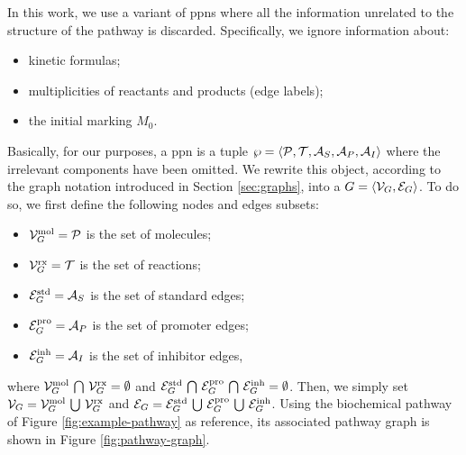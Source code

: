 In this work, we use a variant of \glspl{ppn} where all the information unrelated to the structure of the pathway is discarded. Specifically, we ignore information about:
\begin{itemize}
    \item kinetic formulas;
    \item multiplicities of reactants and products (\ie edge labels);
    \item the initial marking $M_0$.
\end{itemize}
Basically, for our purposes, a \gls{ppn} is a tuple $\wp = \Tuple{\Cal{P},\Cal{T},\Cal{A}_{S}, \Cal{A}_{P},\Cal{A}_{I}}$ where the irrelevant components have been omitted. We rewrite this object, according to the graph notation introduced in Section \ref{sec:graphs}, into a  $G = \Tuple{\Cal{V}_G, \Cal{E}_G}$. To do so, we first define the following nodes and edges subsets:
\begin{itemize}
    \item $\Cal{V}_{G}^{\Fun{mol}} = \Cal{P}$ is the set of molecules;
    \item $\Cal{V}_{G}^{\Fun{rx}} = \Cal{T}$ is the set of reactions;
    \item $\Cal{E}_{G}^{\Fun{std}} = \Cal{A}_S$ is the set of standard edges;
    \item $\Cal{E}_{G}^{\Fun{pro}} = \Cal{A}_P$ is the set of promoter edges;
    \item $\Cal{E}_{G}^{\Fun{inh}} = \Cal{A}_I$ is the set of inhibitor edges,
\end{itemize}
where $\Cal{V}_{G}^{\Fun{mol}} \Inter \Cal{V}_{G}^{\Fun{rx}} = \emptyset$ and $\Cal{E}_{G}^{\Fun{std}} \Inter \Cal{E}_{G}^{\Fun{pro}} \Inter \Cal{E}_{G}^{\Fun{inh}} = \emptyset$. Then, we simply set $\Cal{V}_G = \Cal{V}_G^{\Fun{mol}} \Union \Cal{V}_G^{\Fun{rx}}$ and $\Cal{E}_G = \Cal{E}_G^{\Fun{std}} \Union \Cal{E}_G^{\Fun{pro}} \Union \Cal{E}_G^{\Fun{inh}}$.
Using the biochemical pathway of Figure \ref{fig:example-pathway} as reference, its associated pathway graph is shown in Figure \ref{fig:pathway-graph}.
\begin{figure*}[h!]
    \centering
    \resizebox{.6\textwidth}{!}{}
    \caption{The pathway graph obtained by omitting kinetic formulas and edge labels from the one in Figure \ref{subfig:pathway-petri-net}. Notice that the names of the molecules are displayed for visual aid, but are not included of the pathway graph.}
    \label{fig:pathway-graph}
\end{figure*}
